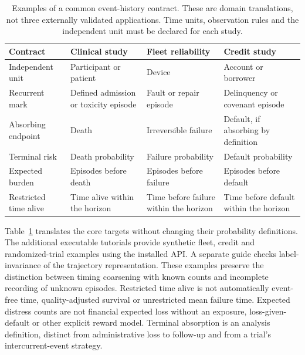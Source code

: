 \documentclass[article,nojss]{jss}
\begin{document}
\begin{table}[t]
\centering\small
\begin{tabular}{p{}p{}p{}p{}}
\toprule
Contract & Clinical study & Fleet reliability & Credit study \\
\midrule
Independent unit & Participant or patient & Device & Account or borrower \\
Recurrent mark & Defined admission or toxicity episode & Fault or repair episode & Delinquency or covenant episode \\
Absorbing endpoint & Death & Irreversible failure & Default, if absorbing by definition \\
Terminal risk & Death probability & Failure probability & Default probability \\
Expected burden & Episodes before death & Episodes before failure & Episodes before default \\
Restricted time alive & Time alive within the horizon & Time before failure within the horizon & Time before default within the horizon \\
\bottomrule
\end{tabular}
\caption{Examples of a common event-history contract. These are domain translations, not three externally validated applications. Time units, observation rules and the independent unit must be declared for each study.}
\label{tab:domain_contract}
\end{table}

Table~\ref{tab:domain_contract} translates the core targets without changing their probability definitions. The additional executable tutorials provide synthetic fleet, credit and randomized-trial examples using the installed API. A separate guide checks label-invariance of the trajectory representation. These examples preserve the distinction between timing coarsening with known counts and incomplete recording of unknown episodes. Restricted time alive is not automatically event-free time, quality-adjusted survival or unrestricted mean failure time. Expected distress counts are not financial expected loss without an exposure, loss-given-default or other explicit reward model. Terminal absorption is an analysis definition, distinct from administrative loss to follow-up and from a trial's intercurrent-event strategy.
\end{document}
